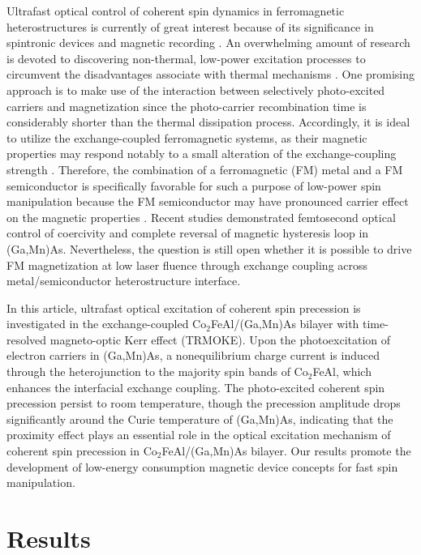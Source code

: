 \documentclass[%
 reprint,
superscriptaddress,
 amsmath,amssymb,
 aps,
prl,
]{revtex4-1}
\begin{document}
Ultrafast optical control of coherent spin dynamics in ferromagnetic heterostructures is currently of great interest because of its significance in spintronic devices and magnetic recording \cite{1,2,3,4,5,6,7,8,9}. An overwhelming amount of research is devoted to discovering non-thermal, low-power excitation processes to circumvent the disadvantages associate with thermal mechanisms \cite{10,11,12,13,14,15,16}. One promising approach is to make use of the interaction between selectively photo-excited carriers and magnetization since the photo-carrier recombination time is considerably shorter than the thermal dissipation process. Accordingly, it is ideal to utilize the exchange-coupled ferromagnetic systems, as their magnetic properties may respond notably to a small alteration of the exchange-coupling strength \cite{17,18}. Therefore, the combination of a ferromagnetic (FM) metal and a FM semiconductor is specifically favorable for such a purpose of low-power spin manipulation because the FM semiconductor may have pronounced carrier effect on the magnetic properties \cite{19}. Recent studies demonstrated femtosecond optical control of coercivity \cite{20} and complete reversal of magnetic hysteresis loop \cite{21,22,23} in (Ga,Mn)As. Nevertheless, the question is still open whether it is possible to drive FM magnetization at low laser fluence through exchange coupling across metal/semiconductor heterostructure interface.

In this article, ultrafast optical excitation of coherent spin precession is investigated in the exchange-coupled Co$_2$FeAl/(Ga,Mn)As bilayer with time-resolved magneto-optic Kerr effect (TRMOKE). Upon the photoexcitation of electron carriers in (Ga,Mn)As, a nonequilibrium charge current is induced through the heterojunction to the majority spin bands of Co$_2$FeAl, which enhances the interfacial exchange coupling. The photo-excited coherent spin precession persist to room temperature, though the precession amplitude drops significantly around the Curie temperature of (Ga,Mn)As, indicating that the proximity effect plays an essential role in the optical excitation mechanism of coherent spin precession in Co$_2$FeAl/(Ga,Mn)As bilayer. Our results promote the development of low-energy consumption magnetic device concepts for fast spin manipulation.

\section{Results}
\end{document}

